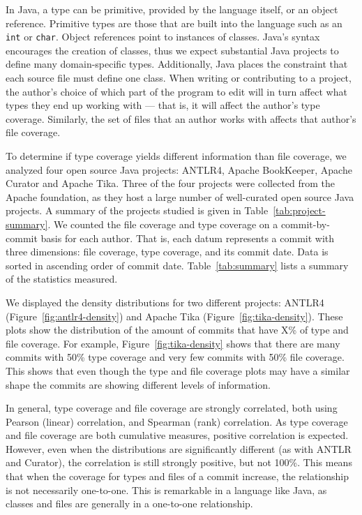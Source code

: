 In Java, a type can be primitive, provided by the language itself, or an object reference. Primitive types are those that are built into the language such as an \texttt{int} or \texttt{char}. Object references point to instances of classes. Java's syntax encourages the creation of classes, thus we expect substantial Java projects to define many domain-specific types. Additionally, Java places the constraint that each source file must define one class. When writing or contributing to a project, the author's choice of which part of the program to edit will in turn affect what types they end up working with --- that is, it will affect the author's type coverage. Similarly, the set of files that an author works with affects that author's file coverage.

To determine if type coverage yields different information than file coverage, we analyzed four open source Java projects: ANTLR4, Apache BookKeeper, Apache Curator and Apache Tika. Three of the four projects were collected from the Apache foundation, as they host a large number of well-curated open source Java projects. A summary of the projects studied is given in Table~\ref{tab:project-summary}. We counted the file coverage and type coverage on a commit-by-commit basis for each author. That is, each datum represents a commit with three dimensions: file coverage, type coverage, and its commit date. Data is sorted in ascending order of commit date. Table~\ref{tab:summary} lists a summary of the statistics measured.

We displayed the density distributions for two different projects: ANTLR4 (Figure~\ref{fig:antlr4-density}) and Apache Tika (Figure~\ref{fig:tika-density}). These plots show the distribution of the amount of commits that have X\% of type and file coverage. For example, Figure~\ref{fig:tika-density} shows that there are many commits with 50\% type coverage and very few commits with 50\% file coverage. This shows that even though the type and file coverage plots may have a similar shape the commits are showing different levels of information. 

In general, type coverage and file coverage are strongly correlated, both using Pearson (linear) correlation, and Spearman (rank) correlation. As type coverage and file coverage are both cumulative measures, positive correlation is expected. However, even when the distributions are significantly different (as with ANTLR and Curator), the correlation is still strongly positive, but not 100\%. This means that when the coverage for types and files of a commit increase, the relationship is not necessarily one-to-one. This is remarkable in a language like Java, as classes and files are generally in a one-to-one relationship.

